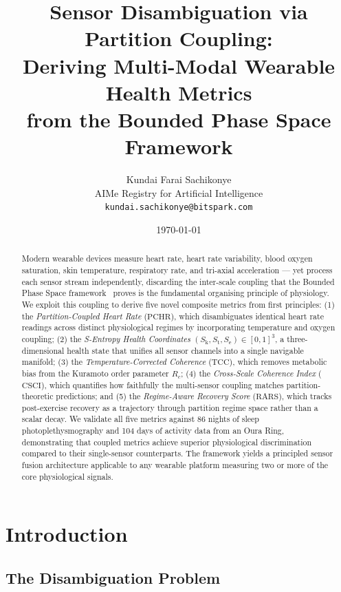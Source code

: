 \documentclass[10pt,twocolumn,a4paper]{article}
\title{\textbf{Sensor Disambiguation via Partition Coupling:\\
Deriving Multi-Modal Wearable Health Metrics\\from the Bounded Phase Space Framework}\\[0.5em]
}
\author{
Kundai Farai Sachikonye\\
AIMe Registry for Artificial Intelligence\\
\texttt{kundai.sachikonye@bitspark.com}
}
\date{\today}
\theoremstyle{definition}
\newcommand{\SE}{S_{\text{e}}}
\newcommand{\SK}{S_{\text{k}}}
\newcommand{\ST}{S_{\text{t}}}
\newcommand{\Rc}{R_c}
\newcommand{\PCHR}{\text{PCHR}}
\newcommand{\CSCI}{\text{CSCI}}
\newcommand{\RARS}{\text{RARS}}
\newcommand{\TCC}{\text{TCC}}
\begin{document}
\maketitle

\begin{abstract}
Modern wearable devices measure heart rate, heart rate variability, blood oxygen
saturation, skin temperature, respiratory rate, and tri-axial acceleration ---
yet process each sensor stream independently, discarding the inter-scale coupling
that the Bounded Phase Space framework~\cite{sachikonye2024integration} proves is
the fundamental organising principle of physiology. We exploit this coupling to
derive five novel composite metrics from first principles: (1) the
\emph{Partition-Coupled Heart Rate} ($\PCHR$), which disambiguates identical
heart rate readings across distinct physiological regimes by incorporating
temperature and oxygen coupling; (2) the \emph{S-Entropy Health Coordinates}
$(\SK, \ST, \SE) \in [0,1]^3$, a three-dimensional health state that unifies
all sensor channels into a single navigable manifold; (3) the
\emph{Temperature-Corrected Coherence} ($\TCC$), which removes metabolic bias
from the Kuramoto order parameter $\Rc$; (4) the \emph{Cross-Scale Coherence
Index} ($\CSCI$), which quantifies how faithfully the multi-sensor coupling
matches partition-theoretic predictions; and (5) the \emph{Regime-Aware Recovery
Score} ($\RARS$), which tracks post-exercise recovery as a trajectory through
partition regime space rather than a scalar decay. We validate all five metrics
against 86 nights of sleep photoplethysmography and 104 days of activity data
from an Oura Ring, demonstrating that coupled metrics achieve superior
physiological discrimination compared to their single-sensor counterparts.
The framework yields a principled sensor fusion architecture applicable to
any wearable platform measuring two or more of the core physiological signals.
\end{abstract}

\section{Introduction}
\label{sec:introduction}

\subsection{The Disambiguation Problem}
\end{document}
